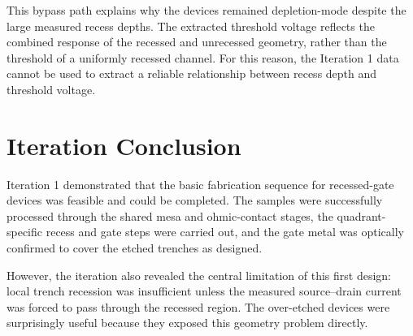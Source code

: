 

This bypass path explains why the devices remained depletion-mode despite the
large measured recess depths. The extracted threshold voltage reflects the
combined response of the recessed and unrecessed geometry, rather than the
threshold of a uniformly recessed channel. For this reason, the Iteration 1 data
cannot be used to extract a reliable relationship between recess depth and
threshold voltage.

\section{Iteration Conclusion}

Iteration 1 demonstrated that the basic fabrication sequence for recessed-gate
devices was feasible and could be completed. The samples were successfully processed through
the shared mesa and ohmic-contact stages, the quadrant-specific recess and
gate steps were carried out, and the gate metal was optically confirmed to
cover the etched trenches as designed.

However, the iteration also revealed the central limitation of this first
design: local trench recession was insufficient unless the measured
source--drain current was forced to pass through the recessed region. The
over-etched devices were surprisingly useful because they exposed this geometry
problem directly. 
